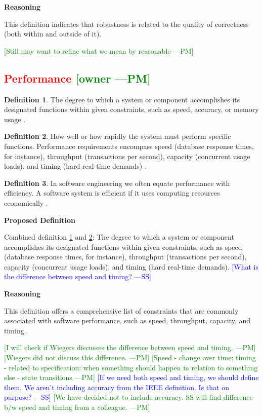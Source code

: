 \documentclass[letterpaper,cleveref]{lipics-v2019}
\newcommand{\authornote}[3]{\textcolor{#1}{[#3 ---#2]}}
\newcommand{\authornote}[3]{}
\newcommand{\wss}[1]{\authornote{blue}{SS}{#1}} %
\newcommand{\pmi}[1]{\authornote{green}{PM}{#1}} %
\newcommand{\notdone}[1]{\textcolor{red}{#1}}
\theoremstyle{definition}
\newtheorem{defn}{Definition}
\begin{document}
\noindent \textbf{Reasoning}

This definition indicates that robustness is related to the quality of
correctness (both within and outside of it). 

\pmi{Still may want to refine what we mean by reasonable}

\subsection{\notdone{Performance} \pmi{owner}}

\begin{defn} \label{PerformanceDefnSelected}
	The degree to which a system or component accomplishes its designated functions
	within given constraints, such as speed, accuracy, or memory usage
	\citep{IEEEStdGlossarySET1990}.
\end{defn}
\begin{defn} \label{PerformanceDefnSelected2}
	How well or how rapidly the system must perform specific functions. Performance
	requirements encompass speed (database response times, for instance), throughput
	(transactions per second), capacity (concurrent usage loads), and timing (hard
	real-time demands) \citep{wiegers2003softreq}.
\end{defn}
\begin{defn}
	In software engineering we often equate performance with efficiency. A software system is efficient if it uses computing resources economically
	\citep{ghezzi1991fundamentals}.
\end{defn}

\noindent \textbf{Proposed Definition}

Combined definition \ref{PerformanceDefnSelected} and
\ref{PerformanceDefnSelected2}: The degree to which a system or component
accomplishes its designated functions within given constraints, such as speed
(database response times, for instance), throughput (transactions per second),
capacity (concurrent usage loads), and timing (hard real-time
demands). \wss{What is the difference between speed and timing?}

\noindent \textbf{Reasoning}

This definition offers a comprehensive list of constraints that are commonly
associated with software performance, such as speed, throughput, capacity, and
timing.

\pmi{I will check if Wiegers discusses the difference between speed and timing.}
\pmi{Wiegers did not discuss this difference.}
\pmi{Speed - change over time; timing - related to specification: when something
	should happen in relation to something else - state transitions}
\wss{If we need both speed and timing, we should define them.  We aren't
  including accuracy from the IEEE definition.  Is that on purpose?}
\pmi{We have decided not to include accuracy. SS will find difference b/w speed and timing from a colleague.}
\end{document}
